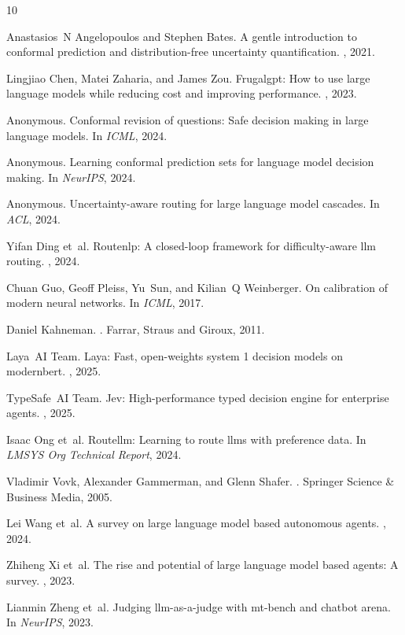 \documentclass[11pt,a4paper]{article}
\begin{document}

\begin{thebibliography}{10}

Anastasios~N Angelopoulos and Stephen Bates.
\newblock A gentle introduction to conformal prediction and distribution-free uncertainty quantification.
, 2021.

Lingjiao Chen, Matei Zaharia, and James Zou.
\newblock Frugalgpt: How to use large language models while reducing cost and improving performance.
, 2023.

Anonymous.
\newblock Conformal revision of questions: Safe decision making in large language models.
\newblock In {\em ICML}, 2024.

Anonymous.
\newblock Learning conformal prediction sets for language model decision making.
\newblock In {\em NeurIPS}, 2024.

Anonymous.
\newblock Uncertainty-aware routing for large language model cascades.
\newblock In {\em ACL}, 2024.

Yifan Ding et~al.
\newblock Routenlp: A closed-loop framework for difficulty-aware llm routing.
, 2024.

Chuan Guo, Geoff Pleiss, Yu~Sun, and Kilian~Q Weinberger.
\newblock On calibration of modern neural networks.
\newblock In {\em ICML}, 2017.

Daniel Kahneman.
.
\newblock Farrar, Straus and Giroux, 2011.

Laya~AI Team.
\newblock Laya: Fast, open-weights system 1 decision models on modernbert.
, 2025.

TypeSafe~AI Team.
\newblock Jev: High-performance typed decision engine for enterprise agents.
, 2025.

Isaac Ong et~al.
\newblock Routellm: Learning to route llms with preference data.
\newblock In {\em LMSYS Org Technical Report}, 2024.

Vladimir Vovk, Alexander Gammerman, and Glenn Shafer.
.
\newblock Springer Science \& Business Media, 2005.

Lei Wang et~al.
\newblock A survey on large language model based autonomous agents.
, 2024.

Zhiheng Xi et~al.
\newblock The rise and potential of large language model based agents: A survey.
, 2023.

Lianmin Zheng et~al.
\newblock Judging llm-as-a-judge with mt-bench and chatbot arena.
\newblock In {\em NeurIPS}, 2023.

\end{thebibliography}
\end{document}
